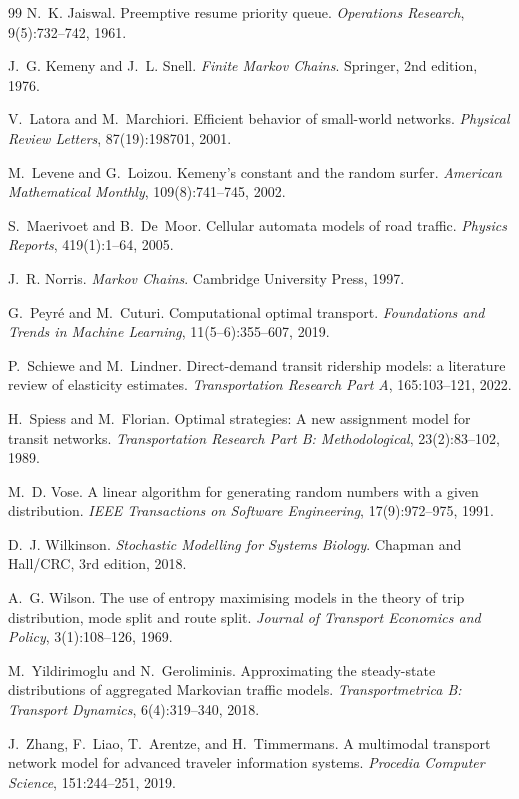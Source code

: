 \documentclass[11pt,a4paper]{article}
\theoremstyle{plain}
\theoremstyle{definition}
\theoremstyle{remark}
\begin{document}
\begin{thebibliography}{99}
N.~K. Jaiswal.
Preemptive resume priority queue.
\emph{Operations Research}, 9(5):732--742, 1961.

J.~G. Kemeny and J.~L. Snell.
\emph{Finite Markov Chains}.
Springer, 2nd edition, 1976.

V.~Latora and M.~Marchiori.
Efficient behavior of small-world networks.
\emph{Physical Review Letters}, 87(19):198701, 2001.

M.~Levene and G.~Loizou.
Kemeny's constant and the random surfer.
\emph{American Mathematical Monthly}, 109(8):741--745, 2002.

S.~Maerivoet and B.~De~Moor.
Cellular automata models of road traffic.
\emph{Physics Reports}, 419(1):1--64, 2005.

J.~R. Norris.
\emph{Markov Chains}.
Cambridge University Press, 1997.

G.~Peyré and M.~Cuturi.
Computational optimal transport.
\emph{Foundations and Trends in Machine Learning}, 11(5--6):355--607, 2019.

P.~Schiewe and M.~Lindner.
Direct-demand transit ridership models: a literature review of elasticity estimates.
\emph{Transportation Research Part A}, 165:103--121, 2022.

H.~Spiess and M.~Florian.
Optimal strategies: A new assignment model for transit networks.
\emph{Transportation Research Part B: Methodological}, 23(2):83--102, 1989.

M.~D. Vose.
A linear algorithm for generating random numbers with a given distribution.
\emph{IEEE Transactions on Software Engineering}, 17(9):972--975, 1991.

D.~J. Wilkinson.
\emph{Stochastic Modelling for Systems Biology}.
Chapman and Hall/CRC, 3rd edition, 2018.

A.~G. Wilson.
The use of entropy maximising models in the theory of trip distribution,
mode split and route split.
\emph{Journal of Transport Economics and Policy}, 3(1):108--126, 1969.

M.~Yildirimoglu and N.~Geroliminis.
Approximating the steady-state distributions of aggregated Markovian
traffic models.
\emph{Transportmetrica B: Transport Dynamics}, 6(4):319--340, 2018.

J.~Zhang, F.~Liao, T.~Arentze, and H.~Timmermans.
A multimodal transport network model for advanced traveler information systems.
\emph{Procedia Computer Science}, 151:244--251, 2019.

\end{thebibliography}
\end{document}

